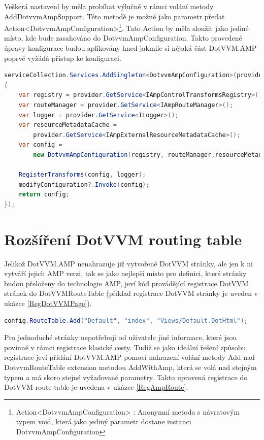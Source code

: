 Veškerá nastavení by měla probíhat výlučně v rámci volání metody AddDotvvmAmpSupport. Této metodě je možné jako parametr předat Action<DotvvmAmpConfiguration>\footnote{Action<DotvvmAmpConfiguration> : Anonymní metoda s návratovým typem void, která jako jediný parametr dostane instanci DotvvmAmpConfiguration}. Tato Action by měla sloužit jako jediné místo, kde bude zasahováno do DotvvmAmpConfiguration. Takto provedené úpravy konfigurace budou aplikovány hned jakmile si nějaká část DotVVM.AMP poprvé vyžádá přístup ke konfiguraci.

\begin{lstlisting}[language=c#, caption=Registrace DotvvmAmpConfiguration,label=RegAmpConfig,captionpos=t]
serviceCollection.Services.AddSingleton<DotvvmAmpConfiguration>(provider =>
{
    var registry = provider.GetService<IAmpControlTransformsRegistry>();
    var routeManager = provider.GetService<IAmpRouteManager>();
    var logger = provider.GetService<ILogger>();
    var resourceMetadataCache =
        provider.GetService<IAmpExternalResourceMetadataCache>();
    var config =
        new DotvvmAmpConfiguration(registry, routeManager,resourceMetadataCache);
        
    RegisterTransforms(config, logger);
    modifyConfiguration?.Invoke(config);
    return config;
});
\end{lstlisting}
\section{Rozšíření DotVVM routing table}
Jelikož DotVVM.AMP nenahrazuje již vytvořené DotVVM stránky, ale jen k ni vytváří jejich AMP verzi, tak se jako nejlepší místo pro definici, které stránky budou přeloženy do technologie AMP, jeví kód provádějící registrace DotVVM stránek do DotVVMRouteTable (příklad registrace DotVVM stránky je uveden v ukázce \ref{RegDotVVMPage}).

\begin{lstlisting}[language=c#, caption=Registrace DotVVM stránky do DotvvmRouteTable,label=RegDotVVMPage,captionpos=t]
config.RouteTable.Add("Default", "index", "Views/Default.DotHtml");
\end{lstlisting}

Pro jednoduché stránky nepotřebuji od uživatele jiné informace, které jsou povinné v rámci registrace klasické cesty.
Tudíž se jako ideální řešení způsobu registrace jeví přidání DotVVM.AMP pomocí nahrazení volání metody Add nad DotvvmRouteTable extension metodou AddWithAmp, která se volá nad stejným typem a má skoro stejné vyžadované parametry. Takto upravená registrace do DotVVM route table je uvedena v ukázce \ref{RegAmpRoute}.

